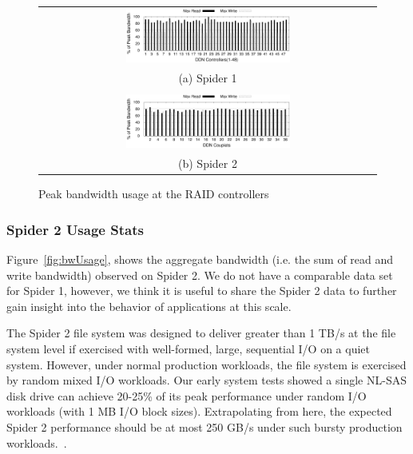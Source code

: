 \begin{figure}[!thb]
\begin{center}
\begin{tabular}{c}
\hspace*{-0.5cm}                                                           
{\includegraphics[width=0.50\textwidth]{./figs/spider1-bw-perc-max.eps}}\\
{(a) Spider 1}\\
\\
\hspace*{-0.5cm}                                                           
{\includegraphics[width=0.50\textwidth]{./figs/spider2-bw-perc-max.eps}}\\
{(b) Spider 2}\\
\end{tabular}
\vspace{-0.1in}
\caption{Peak bandwidth usage at the RAID controllers}
\label{fig:ddnpeakBW}
\end{center}
\end{figure}

\subsubsection{Spider 2 Usage Stats}

Figure~\ref{fig:bwUsage}, shows the aggregate bandwidth (i.e. the sum of read
and write bandwidth) observed on Spider 2. We do not have a comparable data set
for Spider 1, however, we think it is useful to share the Spider 2 data to further 
gain insight into the behavior of applications at this scale. 

The Spider 2 file system was designed to deliver greater than 1 TB/s at the file system level 
if exercised with well-formed, large, sequential I/O on a quiet system. However, under
normal production workloads, the file system is exercised by random mixed I/O
workloads. Our early system tests showed a single NL-SAS disk drive can achieve
20-25\% of its peak performance under random I/O workloads (with 1 MB I/O block
sizes). Extrapolating from here, the expected Spider 2 performance should be 
at most 250 GB/s under such bursty production workloads.~\cite{bestpractices}.

